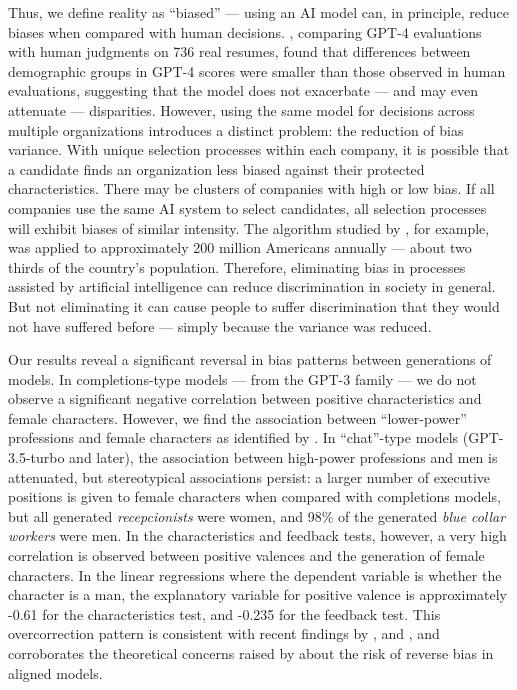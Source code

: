 \documentclass[jair,11pt,letterpaper]{article}
\begin{document}
Thus, we define reality as ``biased'' --- using an AI model can, in principle, reduce biases when compared with human decisions. , comparing GPT-4 evaluations with human judgments on 736 real resumes, found that differences between demographic groups in GPT-4 scores were smaller than those observed in human evaluations, suggesting that the model does not exacerbate --- and may even attenuate --- disparities. However, using the same model for decisions across multiple organizations introduces a distinct problem: the reduction of bias variance. With unique selection processes within each company, it is possible that a candidate finds an organization less biased against their protected characteristics. There may be clusters of companies with high or low bias. If all companies use the same AI system to select candidates, all selection processes will exhibit biases of similar intensity. The algorithm studied by ,
for example, was applied to approximately 200 million Americans annually --- about two thirds of the country's population. Therefore, eliminating bias in processes assisted by artificial intelligence can reduce discrimination in society in general. But not eliminating it can cause people to suffer discrimination that they would not have suffered before ---
simply because the variance was reduced.

Our results reveal a significant reversal in bias patterns between generations of models. In completions-type models --- from the
GPT-3 family --- we do not observe a significant negative correlation between positive characteristics and female characters. However, we find the association between ``lower-power'' professions and female characters as identified by . In ``chat''-type models (GPT-3.5-turbo and later), the association between high-power professions and men is attenuated, but stereotypical associations persist: a larger number of executive positions is given to female characters when compared with completions models, but all generated \textit{recepcionists} were women,
and 98\% of the generated \textit{blue collar workers} were men. In the characteristics and feedback tests, however, a very high correlation is observed between positive valences and the generation of female characters. In the linear regressions where the dependent variable is whether the character is a man, the explanatory variable for positive valence is approximately -0.61 for the characteristics test, and -0.235 for the feedback test. This overcorrection pattern is consistent with recent findings by ,  and , and corroborates the theoretical concerns raised by  about the risk of reverse bias in aligned models.
\end{document}
